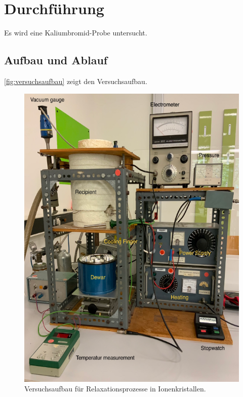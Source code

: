 \section{Durchführung}
\label{sec:Durchführung}

Es wird eine Kaliumbromid-Probe untersucht.

\subsection{Aufbau und Ablauf}
\autoref{fig:versuchsaufbau} zeigt den Versuchsaufbau. 

\begin{figure}[H]
    \centering
    \includegraphics[width=\textwidth]{v48/Bilder/versuchsaufbau.png}
    \caption{Versuchsaufbau für Relaxationsprozesse in Ionenkristallen.}
    \label{fig:versuchsaufbau}
\end{figure}

